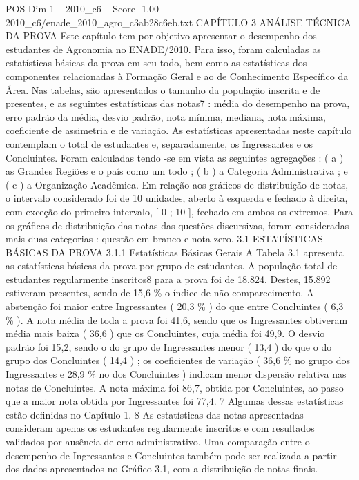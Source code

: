 \begin{textsample}{POS Dim 1 – 2010\_c6 – Score -1.00 – 2010\_c6/enade\_2010\_agro\_c3ab28c6eb.txt}  \label{ex:f1_pos_164}
CAPÍTULO 3 ANÁLISE TÉCNICA DA PROVA Este capítulo tem por objetivo apresentar o desempenho dos estudantes de Agronomia no ENADE/2010.
Para isso, foram calculadas as estatísticas básicas da prova em seu todo, bem como as estatísticas dos componentes relacionadas à Formação Geral e ao de Conhecimento Específico da Área.
Nas tabelas, são apresentados o tamanho da população inscrita e de presentes, e as seguintes estatísticas das notas7 : média do desempenho na prova, erro padrão da média, desvio padrão, nota mínima, mediana, nota máxima, coeficiente de assimetria e de variação.
As estatísticas apresentadas neste capítulo contemplam o total de estudantes e, separadamente, os Ingressantes e os Concluintes.
Foram calculadas tendo -se em vista as seguintes agregações : ( a ) as Grandes Regiões e o país como um todo ; ( b ) a Categoria Administrativa ; e ( c ) a Organização Acadêmica.
Em relação aos gráficos de distribuição de notas, o intervalo considerado foi de 10 unidades, aberto à esquerda e fechado à direita, com exceção do primeiro intervalo, [ 0 ; 10 ], fechado em ambos os extremos.
Para os gráficos de distribuição das notas das questões discursivas, foram consideradas mais duas categorias : questão em branco e nota zero. 3.1 ESTATÍSTICAS BÁSICAS DA PROVA 3.1.1 Estatísticas Básicas Gerais A Tabela 3.1 apresenta as estatísticas básicas da prova por grupo de estudantes.
A população total de estudantes regularmente inscritos8 para a prova foi de 18.824.
Destes, 15.892 estiveram presentes, sendo de 15,6 \% o índice de não comparecimento.
A abstenção foi maior entre Ingressantes ( 20,3 \% ) do que entre Concluintes ( 6,3 \% ).
A nota média de toda a prova foi 41,6, sendo que os Ingressantes obtiveram média mais baixa ( 36,6 ) que os Concluintes, cuja média foi 49,9.
O desvio padrão foi 15,2, sendo o do grupo de Ingressantes menor ( 13,4 ) do que o do grupo dos Concluintes ( 14,4 ) ; os coeficientes de variação ( 36,6 \% no grupo dos Ingressantes e 28,9 \% no dos Concluintes ) indicam menor dispersão relativa nas notas de Concluintes.
A nota máxima foi 86,7, obtida por Concluintes, ao passo que a maior nota obtida por Ingressantes foi 77,4. 7 Algumas dessas estatísticas estão definidas no Capítulo 1. 8 As estatísticas das notas apresentadas consideram apenas os estudantes regularmente inscritos e com resultados validados por ausência de erro administrativo.
Uma comparação entre o desempenho de Ingressantes e Concluintes também pode ser realizada a partir dos dados apresentados no Gráfico 3.1, com a distribuição de notas finais.

\end{textsample}
